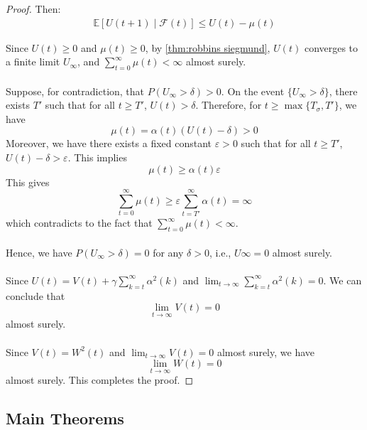 \begin{proof}
\noindent Then:
\begin{align*}
\mathbb{E}[U(t+1) \mid \mathcal{F}(t)] \leq U(t) - \mu(t)
\end{align*}

\noindent Since $U(t) \geq 0$ and $\mu(t) \geq 0$, by \autoref{thm:robbins siegmund}, $U(t)$ converges to a finite limit $U_{\infty}$, and $\sum_{t=0}^{\infty} \mu(t) < \infty$ almost surely.\\ 
\\
Suppose, for contradiction, that $P(U_\infty>\delta)>0$. On the event $\{U_\infty >\delta\}$, there exists $T'$ such that for all $t\ge T'$, $U(t)>\delta$. Therefore, for $t\ge \max\{T_\sigma, T'\}$, we have
$$
\mu(t) = \alpha(t)(U(t)-\delta)>0
$$
Moreover, we have there exists a fixed constant $\varepsilon>0$ such that for all $t\ge T'$, $U(t)-\delta>\varepsilon$. This implies
$$
\mu(t) \ge \alpha(t)\varepsilon
$$
This gives
$$
\sum_{t=0}^\infty \mu(t) \ge \varepsilon \sum_{t=T'}^\infty \alpha(t) = \infty
$$
which contradicts to the fact that $\sum_{t=0}^\infty\mu(t)<\infty$.\\
\\
Hence, we have $P(U_\infty >\delta) = 0$ for any $\delta>0$, i.e., $U\infty =0$ almost surely.\\
\\
Since $U(t) = V(t) + \gamma\sum_{k=t}^\infty \alpha^2(k)$ and $\lim_{t\to\infty}\sum_{k=t}^\infty \alpha^2(k)=0$. We can conclude that
$$
\lim_{t\to \infty} V(t) =0
$$
almost surely.\\
\\
Since $V(t) = W^2(t)$ and $\lim_{t\to \infty} V(t) =0$ almost surely, we have
$$
\lim_{t\to \infty} W(t) =0
$$
almost surely. This completes the proof.
\end{proof}

\subsection{Main Theorems}


